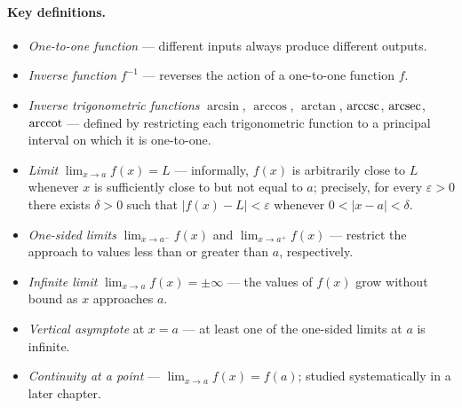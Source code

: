\paragraph{Key definitions.}
\begin{itemize}
    \item \emph{One-to-one function} --- different inputs always produce different outputs.
    \item \emph{Inverse function} \(f^{-1}\) --- reverses the action of a one-to-one function \(f\).
    \item \emph{Inverse trigonometric functions} \(\arcsin\), \(\arccos\), \(\arctan\), \(\arccsc\), \(\arcsec\), \(\arccot\) --- defined by restricting each trigonometric function to a principal interval on which it is one-to-one.
    \item \emph{Limit} \(\lim_{x \to a} f(x) = L\) --- informally, \(f(x)\) is arbitrarily close to \(L\) whenever \(x\) is sufficiently close to but not equal to \(a\); precisely, for every \(\varepsilon > 0\) there exists \(\delta > 0\) such that \(|f(x) - L| < \varepsilon\) whenever \(0 < |x - a| < \delta\).
    \item \emph{One-sided limits} \(\lim_{x \to a^{-}} f(x)\) and \(\lim_{x \to a^{+}} f(x)\) --- restrict the approach to values less than or greater than \(a\), respectively.
    \item \emph{Infinite limit} \(\lim_{x \to a} f(x) = \pm\infty\) --- the values of \(f(x)\) grow without bound as \(x\) approaches \(a\).
    \item \emph{Vertical asymptote} at \(x = a\) --- at least one of the one-sided limits at \(a\) is infinite.
    \item \emph{Continuity at a point} --- \(\lim_{x \to a} f(x) = f(a)\); studied systematically in a later chapter.
\end{itemize}

